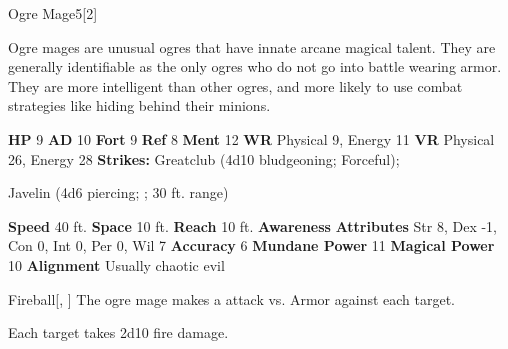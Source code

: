   \begin{monsubsection}{Ogre Mage}{5}[2]
    \vspace{-1em}\vspace{-1em}
    \vspace{0em}

    
        Ogre mages are unusual ogres that have innate arcane magical talent.
        They are generally identifiable as the only ogres who do not go into battle wearing armor.
        They are more intelligent than other ogres, and more likely to use combat strategies like hiding behind their minions.
      
    

    \begin{spellcontent}
      \begin{spelltargetinginfo}
        \pari \textbf{HP} 9 \monsep
          \textbf{AD} 10 \monsep
          \textbf{Fort} 9 \monsep
          \textbf{Ref} 8 \monsep
          \textbf{Ment} 12
        \pari \textbf{WR} Physical 9, Energy 11 \monsep
        \textbf{VR} Physical 26, Energy 28
        \pari \textbf{Strikes:}
            Greatclub  (4d10 bludgeoning; Forceful);
\par Javelin  (4d6 piercing; ; 30 ft. range)
      \end{spelltargetinginfo}
    \end{spellcontent}
    \begin{monsterfooter}
      \pari \textbf{Speed} 40 ft. \monsep
        \textbf{Space} 10 ft. \monsep
        \textbf{Reach} 10 ft.
      \pari \textbf{Awareness} 
      \pari \textbf{Attributes}
        Str 8, Dex -1,
        Con 0, Int 0,
        Per 0, Wil 7
      \pari \textbf{Accuracy} 6 \monsep
        \textbf{Mundane Power} 11 \monsep
      \textbf{Magical Power} 10
      \pari \textbf{Alignment} Usually chaotic evil
    \end{monsterfooter}
  \end{monsubsection}
  \begin{freeability}{Fireball}[, ]
       The ogre mage makes a  attack
        vs. Armor against each target.
    
    \hit Each target takes 2d10 fire damage.
    \end{freeability}
  

